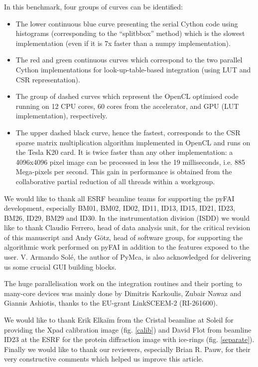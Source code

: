 \documentclass{iucr}
\begin{document}
In this benchmark, four groups of curves can be identified:
\begin{itemize}
  \item The lower continuous blue curve presenting the serial Cython code using
  histograms (corresponding to the ``splitbbox'' method) which is the slowest
  implementation (even if it is 7x faster than a numpy implementation).
  \item The red and green continuous curves which correspond to the two parallel
  Cython implementations for look-up-table-based integration (using LUT and CSR
  representation).
  \item The group of dashed curves which represent the OpenCL optimised code
  running on 12 CPU cores, 60 cores from the accelerator, and GPU (LUT
  implementation), respectively.
  \item The upper dashed black curve, hence the fastest, corresponds to the CSR
  sparse matrix multiplication algorithm implemented in OpenCL and runs on
  the Tesla K20 card.
  It is twice faster than any other implementation: a 4096x4096 pixel
  image can be processed in less the 19 milliseconds, i.e. 885 Mega-pixels
  per second.
  This gain in performance is obtained from the collaborative
  partial reduction of all threads within a workgroup.
\end{itemize}



We would like to thank all ESRF beamline teams for supporting the
pyFAI development, especially BM01, BM02, ID02, ID11, ID13, ID15, ID21, ID23,
BM26, ID29, BM29 and ID30.
In the instrumentation division (ISDD) we would like to thank Claudio
Ferrero, head of data analysis unit, for the critical revision of this
manuscript and Andy G\"otz, head of software group, for supporting the
algorithmic work performed on pyFAI in addition to the features exposed to the
user.
V. Armando Solé, the author of PyMca, is also acknowledged for delivering us
some crucial GUI building blocks.

The huge parallelisation work on the integration routines and their porting to
many-core devices was mainly done by Dimitris Karkoulis, Zubair Nawaz and Giannis Ashiotis,
thanks to the EU-grant LinkSCEEM-2 (RI-261600).

We would like to thank 
Erik Elka\"im from the Cristal beamline at Soleil for
providing the Xpad
calibration image (fig. \ref{calib}) and David Flot from beamline ID23 at
the ESRF for the protein diffraction image with ice-rings (fig.
\ref{separate}).
Finally we would like to thank our reviewers, especially Brian R. Pauw, for
their very constructive comments which helped us improve this article. 
\end{document}
